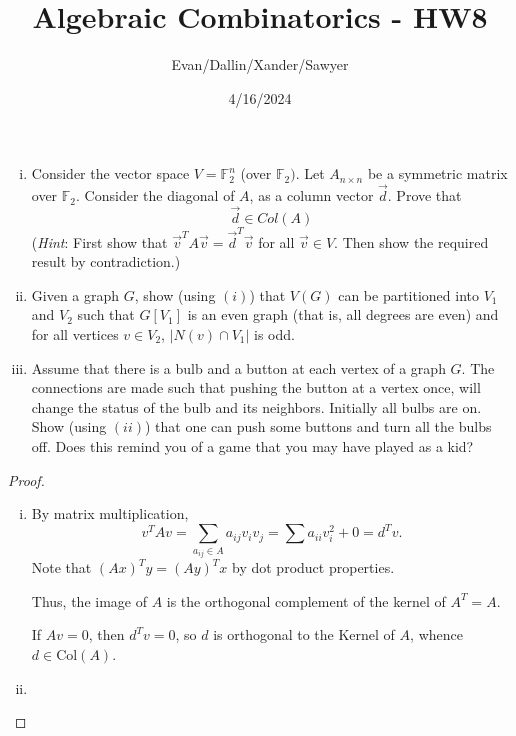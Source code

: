 \documentclass[11pt,letterpaper]{article}
\title{Algebraic Combinatorics - HW8}
\author{Evan/Dallin/Xander/Sawyer}
\date{4/16/2024}
\begin{document}
\maketitle
\begin{quest}[\textcolor{red}{Saving electricity through Linear Algebra and Graph Theory}]
    \begin{enumerate}[(i)]
        \item Consider the vector space $V=\mathbb{F}_2^n$ (over $\mathbb{F}_2)$. Let $A_{n\times n}$ be a symmetric matrix over $\mathbb{F}_2$. Consider the diagonal of $A$, as a column vector $\overrightarrow{d}$. Prove that 
        \[\vec{d}\in Col(A)\]
        (\textit{Hint}: First show that $\vec{v}^{T}A\vec{v}=\vec{d}^{T}\vec{v}$ for all $\vec{v}\in V$. Then show the required result by contradiction.)
        \item Given a graph $G$, show (using $(i)$) that $V(G)$ can be partitioned into $V_1$ and $V_2$ such that $G[V_1]$ is an even graph (that is, all degrees are even) and for all vertices $v\in V_2$, $|N(v)\cap V_1|$ is odd.
        \item Assume that there is a bulb and a button at each vertex of a graph $G$. The connections are made such that pushing the button at a vertex once, will change the status of the bulb and its neighbors. Initially all bulbs are on. Show (using $(ii)$) that one can push some buttons and turn all the bulbs off. Does this remind you of a game that you may have played as a kid?
    \end{enumerate}
\end{quest}
\begin{proof}
    \begin{enumerate}[(i)]
        \item By matrix multiplication, \[v^TAv=\sum_{a_{ij}\in A}a_{ij}v_iv_j=\sum a_{ii}v_i^2+0=d^Tv.\]
        Note that $(Ax)^Ty=(Ay)^Tx$ by dot product properties. 
        
        Thus, the image of $A$ is the orthogonal complement of the kernel of $A^T=A$.

        If $Av=0$, then $d^Tv=0$, so $d$ is orthogonal to the Kernel of $A$, whence $d\in \text{Col}(A)$.

        \item 
    \end{enumerate}

\end{proof}
\end{document}
